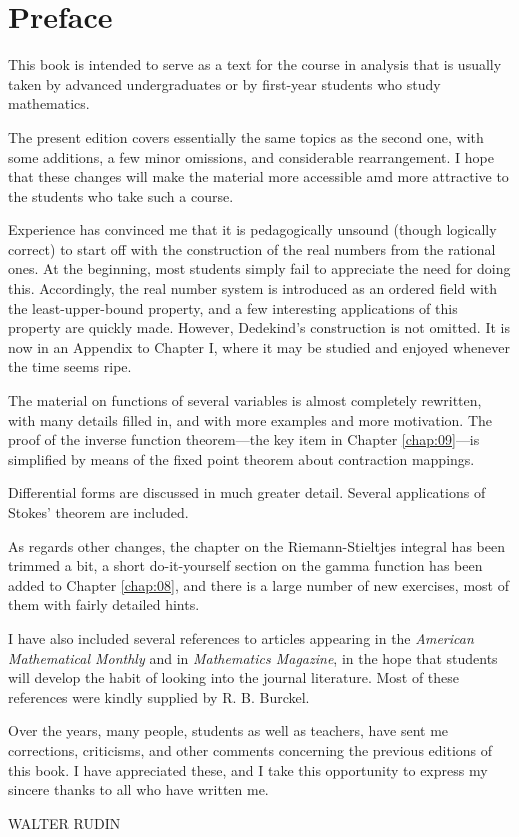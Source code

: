 \chapter*{Preface}
\label{chap:00}
This book is intended to serve as a text for the course in analysis that is usually
taken by advanced undergraduates or by first-year students who study mathematics.


The present edition covers essentially the same topics as the second one,
with some additions, a few minor omissions, and considerable rearrangement.
I hope that these changes will make the material more accessible amd more attractive to the students who take such a course.


Experience has convinced me that it is pedagogically unsound (though
logically correct) to start off with the construction of the real numbers from the
rational ones.
At the beginning, most students simply fail to appreciate the need
for doing this.
Accordingly, the real number system is introduced as an ordered
field with the least-upper-bound property, and a few interesting applications of
this property are quickly made.
However, Dedekind's construction is not omitted.
It is now in an Appendix to Chapter I, where it may be studied and enjoyed
whenever the time seems ripe.


The material on functions of several variables is almost completely rewritten, with many details filled in, and with more examples and more motivation.
The proof of the inverse function theorem---the key item in Chapter \ref{chap:09}---is
simplified by means of the fixed point theorem about contraction mappings.

Differential forms are discussed in much greater detail.
Several applications of
Stokes' theorem are included.


As regards other changes, the chapter on the Riemann-Stieltjes integral
has been trimmed a bit, a short do-it-yourself section on the gamma function
has been added to Chapter \ref{chap:08}, and there is a large number of new exercises, most
of them with fairly detailed hints.


I have also included several references to articles appearing in the \emph{American Mathematical Monthly} and in \emph{Mathematics Magazine}, in the hope that students
will develop the habit of looking into the journal literature.
Most of these
references were kindly supplied by R. B. Burckel.


Over the years, many people, students as well as teachers, have sent me
corrections, criticisms, and other comments concerning the previous editions
of this book.
I have appreciated these, and I take this opportunity to express my sincere thanks to all who have written me.



WALTER RUDIN
